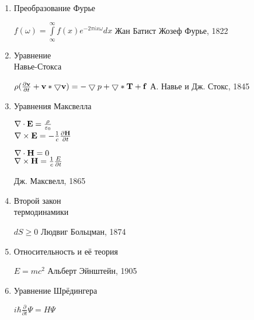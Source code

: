 \documentclass[12pt]{article}
\begin{document}
\begin{enumerate}
 \item Преобразование Фурье \hfill \begin{minipage}[t]{110mm} $f(\omega) = \int\limits_\infty ^\infty f(x)e^{-2\pi ix \omega}dx$  \hfill Жан Батист Жозеф Фурье, 1822 \end{minipage}
 \item 
  \begin{minipage}[t]{35mm} Уравнение \\Навье-Стокса\\ \end{minipage}
  \hfill\begin{minipage}[t]{130mm}$\rho(\frac{\partial {\bf v}}{\partial t}+{\bf v * \bigtriangledown v})= -\bigtriangledown p +\bigtriangledown * {\bf T}+{\bf f} $ \hfill А. Навье и Дж. Стокс, 1845 \end{minipage}
   \item Уравнения Максвелла \hfill \begin{minipage}[t]{110mm}  \begin{minipage}[t]{30mm}  $\nabla\cdot{\bf E} =   \frac{\rho}{\varepsilon_0}$ \\ $\nabla\times{\bf E} = -\frac{1}{c} \frac{\partial{\bf H}}{\partial t}$ \\ \end{minipage}
  \begin{minipage}[t]{30mm} $\nabla\cdot{\bf H} = 0$ \\$\nabla\times{\bf H} = \frac{1}{c} \frac {E}{\partial t}$ \\
   \end{minipage}  \hfill Дж. Максвелл,  1865\end{minipage}
   \item \begin{minipage}[t]{45mm} Второй закон \\термодинамики\\ \end{minipage}
  \hfill
 \begin{minipage}[t]{100mm}  $dS \ge 0$ \hfill Людвиг Больцман, 1874 \end{minipage}
  \item Относительность и её теория \hfill \begin{minipage}[t]{100mm} $E = mc^{2}$ \hfill Альберт Эйнштейн, 1905
\end{minipage}
\item\begin{minipage}[t]{45mm} Уравнение Шрёдингера \end{minipage}  \hfill \begin{minipage}[t]{100mm} $i\hbar\frac{\partial}{\partial t} \Psi=H\Psi $

\end{minipage}
\end{enumerate}
\end{document}
